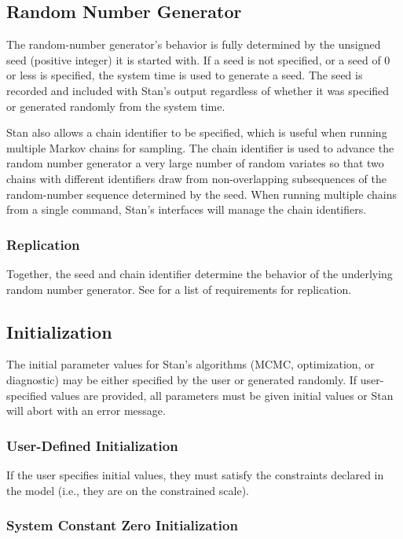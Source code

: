 \subsection{Random Number Generator}

The random-number generator's behavior is fully determined by the
unsigned seed (positive integer) it is started with. If a seed is not
specified, or a seed of 0 or less is specified, the system time is
used to generate a seed. The seed is recorded and included with Stan's
output regardless of whether it was specified or generated randomly
from the system time.

Stan also allows a chain identifier to be specified, which is useful
when running multiple Markov chains for sampling. The chain identifier
is used to advance the random number generator a very large number of
random variates so that two chains with different identifiers draw
from non-overlapping subsequences of the random-number sequence
determined by the seed.  When running multiple chains from a single
command, Stan's interfaces will manage the chain identifiers.

\subsubsection{Replication}

Together, the seed and chain identifier determine the behavior of the
underlying random number generator. See  for a
list of requirements for replication.

\subsection{Initialization}

The initial parameter values for Stan's algorithms (MCMC,
optimization, or diagnostic) may be either specified by the user or
generated randomly. If user-specified values are provided, all
parameters must be given initial values or Stan will abort with an
error message.

\subsubsection{User-Defined Initialization}

If the user specifies initial values, they must satisfy the
constraints declared in the model (i.e., they are on the constrained
scale).

\subsubsection{System Constant Zero Initialization}

